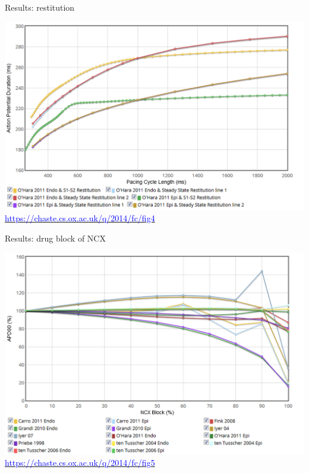 \documentclass[t,xcolor={usenames,dvipsnames}]{beamer}
\newcommand{\myhref}[2]{\href{#1}{\textcolor{Blue}{#2}}}
\newcommand{\myurl}[1]{\myhref{#1}{#1}}
\begin{document}
\begin{frame}{Results: restitution}
\begin{center}
\vspace{-.5cm}
\includegraphics[width=\textwidth]{weblab_fig4}\\
\tiny\myurl{https://chaste.cs.ox.ac.uk/q/2014/fc/fig4}
\end{center}
\end{frame}




\begin{frame}{Results: drug block of NCX}
\begin{center}
\vspace{-.5cm}
\includegraphics[width=\textwidth]{weblab_fig5}\\
\tiny\myurl{https://chaste.cs.ox.ac.uk/q/2014/fc/fig5}
\end{center}
\end{frame}
\end{document}
